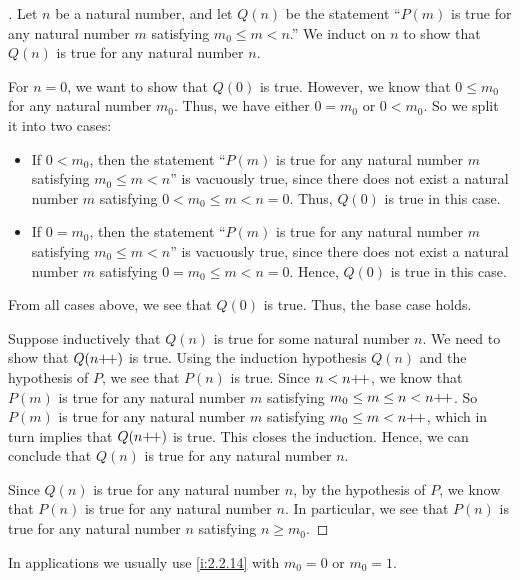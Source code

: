 \begin{proof}[]
  Let \(n\) be a natural number, and let \(Q(n)\) be the statement ``\(P(m)\) is true for any natural number \(m\) satisfying \(m_0 \leq m < n\).''
  We induct on \(n\) to show that \(Q(n)\) is true for any natural number \(n\).

  For \(n = 0\), we want to show that \(Q(0)\) is true.
  However, we know that \(0 \leq m_0\) for any natural number \(m_0\).
  Thus, we have either \(0 = m_0\) or \(0 < m_0\).
  So we split it into two cases:
  \begin{itemize}
    \item If \(0 < m_0\), then the statement ``\(P(m)\) is true for any natural number \(m\) satisfying \(m_0 \leq m < n\)'' is vacuously true, since there does not exist a natural number \(m\) satisfying \(0 < m_0 \leq m < n = 0\).
          Thus, \(Q(0)\) is true in this case.
    \item If \(0 = m_0\), then the statement ``\(P(m)\) is true for any natural number \(m\) satisfying \(m_0 \leq m < n\)'' is vacuously true, since there does not exist a natural number \(m\) satisfying \(0 = m_0 \leq m < n = 0\).
          Hence, \(Q(0)\) is true in this case.
  \end{itemize}
  From all cases above, we see that \(Q(0)\) is true.
  Thus, the base case holds.

  Suppose inductively that \(Q(n)\) is true for some natural number \(n\).
  We need to show that \(Q(n{+}\!{+})\) is true.
  Using the induction hypothesis \(Q(n)\) and the hypothesis of \(P\), we see that \(P(n)\) is true.
  Since \(n < n{+}\!{+}\), we know that \(P(m)\) is true for any natural number \(m\) satisfying \(m_0 \leq m \leq n < n{+}\!{+}\).
  So \(P(m)\) is true for any natural number \(m\) satisfying \(m_0 \leq m < n{+}\!{+}\), which in turn implies that \(Q(n{+}\!{+})\) is true.
  This closes the induction.
  Hence, we can conclude that \(Q(n)\) is true for any natural number \(n\).

  Since \(Q(n)\) is true for any natural number \(n\), by the hypothesis of \(P\), we know that \(P(n)\) is true for any natural number \(n\).
  In particular, we see that \(P(n)\) is true for any natural number \(n\) satisfying \(n \geq m_0\).
\end{proof}

\begin{rmk}\label{i:2.2.15}
  In applications we usually use \cref{i:2.2.14} with \(m_0 = 0\) or \(m_0 = 1\).
\end{rmk}

